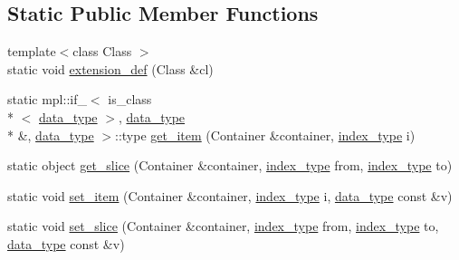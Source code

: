 \subsection*{Static Public Member Functions}
\begin{DoxyCompactItemize}
\item 
{\footnotesize template$<$class Class $>$ }\\static void \hyperlink{classboost_1_1python_1_1std__vector__indexing__suite_a5245748d2887fb696789dd5d3aa789ab}{extension\-\_\-def} (Class \&cl)
\item 
static mpl\-::if\-\_\-$<$ is\-\_\-class\\*
$<$ \hyperlink{classboost_1_1python_1_1std__vector__indexing__suite_a9c3db9df25d6966c54154275377c94ce}{data\-\_\-type} $>$, \hyperlink{classboost_1_1python_1_1std__vector__indexing__suite_a9c3db9df25d6966c54154275377c94ce}{data\-\_\-type} \\*
\&, \hyperlink{classboost_1_1python_1_1std__vector__indexing__suite_a9c3db9df25d6966c54154275377c94ce}{data\-\_\-type} $>$\-::type \hyperlink{classboost_1_1python_1_1std__vector__indexing__suite_a04e38bebceb369bd5f81f4a7558368bb}{get\-\_\-item} (Container \&container, \hyperlink{classboost_1_1python_1_1std__vector__indexing__suite_a3124827b535a08798fbd33b9fee7b668}{index\-\_\-type} i)
\item 
static object \hyperlink{classboost_1_1python_1_1std__vector__indexing__suite_a4123e6c0c99de706c07b215cb4828e91}{get\-\_\-slice} (Container \&container, \hyperlink{classboost_1_1python_1_1std__vector__indexing__suite_a3124827b535a08798fbd33b9fee7b668}{index\-\_\-type} from, \hyperlink{classboost_1_1python_1_1std__vector__indexing__suite_a3124827b535a08798fbd33b9fee7b668}{index\-\_\-type} to)
\item 
static void \hyperlink{classboost_1_1python_1_1std__vector__indexing__suite_a8093bf206598b549f350eb7ab4d59d8a}{set\-\_\-item} (Container \&container, \hyperlink{classboost_1_1python_1_1std__vector__indexing__suite_a3124827b535a08798fbd33b9fee7b668}{index\-\_\-type} i, \hyperlink{classboost_1_1python_1_1std__vector__indexing__suite_a9c3db9df25d6966c54154275377c94ce}{data\-\_\-type} const \&v)
\item 
static void \hyperlink{classboost_1_1python_1_1std__vector__indexing__suite_a5860806d99df81ed866c00d4af262ab2}{set\-\_\-slice} (Container \&container, \hyperlink{classboost_1_1python_1_1std__vector__indexing__suite_a3124827b535a08798fbd33b9fee7b668}{index\-\_\-type} from, \hyperlink{classboost_1_1python_1_1std__vector__indexing__suite_a3124827b535a08798fbd33b9fee7b668}{index\-\_\-type} to, \hyperlink{classboost_1_1python_1_1std__vector__indexing__suite_a9c3db9df25d6966c54154275377c94ce}{data\-\_\-type} const \&v)

\end{DoxyCompactItemize}
